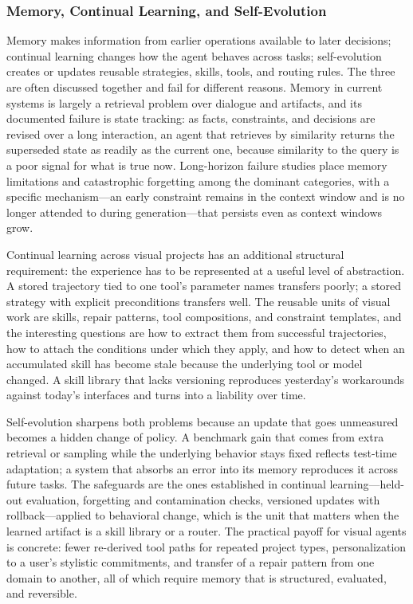 \subsubsection{Memory, Continual Learning, and Self-Evolution}

Memory makes information from earlier operations available to later decisions; continual learning changes how the agent behaves across tasks; self-evolution creates or updates reusable strategies, skills, tools, and routing rules. The three are often discussed together and fail for different reasons. Memory in current systems is largely a retrieval problem over dialogue and artifacts, and its documented failure is state tracking: as facts, constraints, and decisions are revised over a long interaction, an agent that retrieves by similarity returns the superseded state as readily as the current one, because similarity to the query is a poor signal for what is true now. Long-horizon failure studies place memory limitations and catastrophic forgetting among the dominant categories, with a specific mechanism---an early constraint remains in the context window and is no longer attended to during generation---that persists even as context windows grow.

Continual learning across visual projects has an additional structural requirement: the experience has to be represented at a useful level of abstraction. A stored trajectory tied to one tool's parameter names transfers poorly; a stored strategy with explicit preconditions transfers well. The reusable units of visual work are skills, repair patterns, tool compositions, and constraint templates, and the interesting questions are how to extract them from successful trajectories, how to attach the conditions under which they apply, and how to detect when an accumulated skill has become stale because the underlying tool or model changed. A skill library that lacks versioning reproduces yesterday's workarounds against today's interfaces and turns into a liability over time.

Self-evolution sharpens both problems because an update that goes unmeasured becomes a hidden change of policy. A benchmark gain that comes from extra retrieval or sampling while the underlying behavior stays fixed reflects test-time adaptation; a system that absorbs an error into its memory reproduces it across future tasks. The safeguards are the ones established in continual learning---held-out evaluation, forgetting and contamination checks, versioned updates with rollback---applied to behavioral change, which is the unit that matters when the learned artifact is a skill library or a router. The practical payoff for visual agents is concrete: fewer re-derived tool paths for repeated project types, personalization to a user's stylistic commitments, and transfer of a repair pattern from one domain to another, all of which require memory that is structured, evaluated, and reversible.


